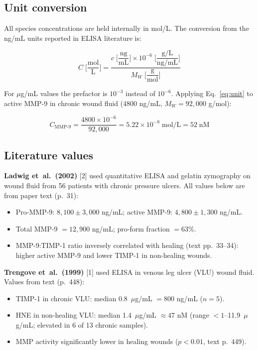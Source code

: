 \documentclass[10pt,a4paper]{article}
\numberwithin{equation}{section}
\newcommand{\cit}[1]{[#1]}   %
\begin{document}
\subsection{Unit conversion}

All species concentrations are held internally in mol/L. The conversion from the
ng/mL units reported in ELISA literature is:

\begin{equation}
C \;\bigg[\frac{\text{mol}}{\text{L}}\bigg]
= \frac{c\;\bigg[\dfrac{\text{ng}}{\text{mL}}\bigg]
  \times 10^{-6}\;\bigg[\dfrac{\text{g/L}}{\text{ng/mL}}\bigg]}
  {M_W\;\bigg[\dfrac{\text{g}}{\text{mol}}\bigg]}
\label{eq:unit}
\end{equation}

For $\mu$g/mL values the prefactor is $10^{-3}$ instead of $10^{-6}$. Applying
Eq.~\eqref{eq:unit} to active MMP-9 in chronic wound fluid (4800 ng/mL,
$M_W = 92{,}000$ g/mol):

\begin{equation*}
C_{\text{MMP-9}} = \frac{4800 \times 10^{-6}}{92{,}000}
= 5.22 \times 10^{-8}\;\text{mol/L} = 52\;\text{nM}
\end{equation*}

\subsection{Literature values}

\textbf{Ladwig et~al.\ (2002)} \cit{2} used quantitative ELISA and gelatin
zymography on wound fluid from 56 patients with chronic pressure ulcers. All values
below are from paper text (p.~31):

\begin{itemize}[noitemsep]
  \item Pro-MMP-9: $8{,}100 \pm 3{,}000$ ng/mL; active MMP-9: $4{,}800 \pm 1{,}300$ ng/mL.
  \item Total MMP-9 $= 12{,}900$ ng/mL; pro-form fraction $= 63\%$.
  \item MMP-9:TIMP-1 ratio inversely correlated with healing
    (text pp.~33--34): higher active MMP-9 and lower TIMP-1 in non-healing wounds.
\end{itemize}

\textbf{Trengove et~al.\ (1999)} \cit{1} used ELISA in venous leg ulcer (VLU) wound
fluid. Values from text (p.~448):

\begin{itemize}[noitemsep]
  \item TIMP-1 in chronic VLU: median 0.8~$\mu$g/mL $= 800$ ng/mL ($n = 5$).
  \item HNE in non-healing VLU: median 1.4~$\mu$g/mL $\approx 47$ nM
    (range $<1$--11.9~$\mu$g/mL; elevated in 6 of 13 chronic samples).
  \item MMP activity significantly lower in healing wounds ($p < 0.01$, text p.~449).
\end{itemize}
\end{document}
